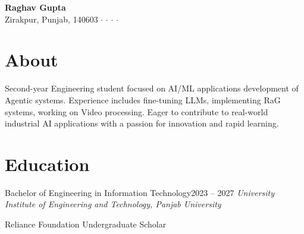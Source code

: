 \documentclass[10pt, letterpaper]{article}
\newcommand{\contactdivider}{\hspace{0.2cm}$\cdot$\hspace{0.2cm}}
\newcommand{\headernamestyle}[1]{{\fontsize{28pt}{32pt}\selectfont\textbf{#1}}}
\begin{document}

\begin{center}
    \headernamestyle{Raghav Gupta}\\[0.25cm]
    \footnotesize
    {\faMapMarker*} Zirakpur, Punjab, 140603 \contactdivider
     \contactdivider
     \contactdivider
     \contactdivider
\end{center}

\section{About}
\begin{minipage}{\linewidth}
Second-year Engineering student focused on AI/ML applications development of Agentic systems. Experience includes fine-tuning LLMs, implementing RaG systems, working on Video processing. Eager to contribute to real-world industrial AI applications with a passion for innovation and rapid learning.
\end{minipage}

\section{Education}
\begin{educationentry}{Bachelor of Engineering in Information Technology}{2023 -- 2027}
\textit{University Institute of Engineering and Technology, Panjab University}
\begin{achievementlist}
    \item Reliance Foundation Undergraduate Scholar
\end{achievementlist}
\end{educationentry}

\end{document}
